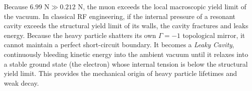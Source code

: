 Because $6.99\text{ N}\gg0.212\text{ N}$, the muon exceeds the local macroscopic yield limit of the vacuum. In classical RF engineering, if the internal pressure of a resonant cavity exceeds the structural yield limit of its walls, the cavity fractures and leaks energy. Because the heavy particle shatters its own $\Gamma=-1$ topological mirror, it cannot maintain a perfect short-circuit boundary. It becomes a \textit{Leaky Cavity}, continuously bleeding kinetic energy into the ambient vacuum until it relaxes into a stable ground state (the electron) whose internal tension is below the structural yield limit. This provides the mechanical origin of heavy particle lifetimes and weak decay.